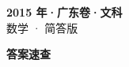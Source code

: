 \documentclass[zihao=-4, a4paper]{ctexart}
\begin{document}
\begin{center}
  {\Large\bfseries 2015 年·广东卷·文科}\\[4pt]
  {\large 数学 · 简答版}
\end{center}
\medskip
{}

\clearpage
{}
\begin{center}{\Large\bfseries 答案速查}\end{center}
\medskip

\end{document}
